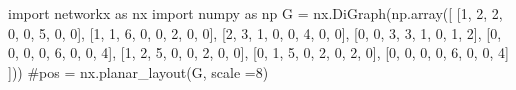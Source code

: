 
\begin{sympycode}
import networkx as nx
import numpy as np
G = nx.DiGraph(np.array([
    [1, 2, 2, 0, 0, 5, 0, 0],
    [1, 1, 6, 0, 0, 2, 0, 0],
    [2, 3, 1, 0, 0, 4, 0, 0],
    [0, 0, 3, 3, 1, 0, 1, 2],
    [0, 0, 0, 0, 6, 0, 0, 4],
    [1, 2, 5, 0, 0, 2, 0, 0],
    [0, 1, 5, 0, 2, 0, 2, 0],
    [0, 0, 0, 0, 6, 0, 0, 4]
    ]))
#pos = nx.planar_layout(G, scale =8)
\end{sympycode}

